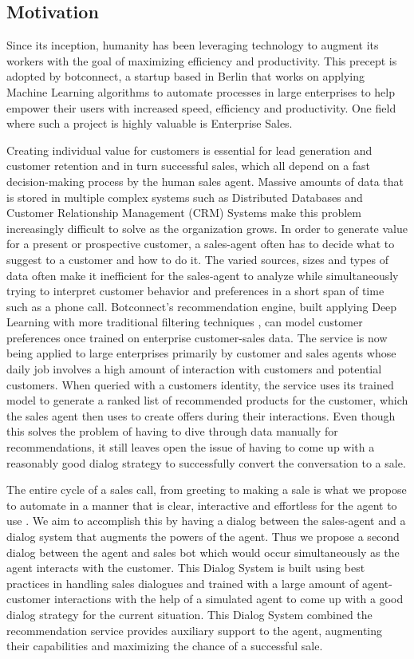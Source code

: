 \documentclass[14pt]{extarticle}
\numberwithin{equation}{section}
\begin{document}
	\subsection{Motivation}
	Since its inception, humanity has been leveraging technology to augment its workers with the goal of maximizing efficiency and productivity. This precept is adopted by botconnect, a startup based in Berlin that works on applying Machine Learning algorithms to automate processes in large enterprises to help empower their users with increased speed, efficiency and productivity. One field where such a project is highly valuable is Enterprise Sales. \par
	Creating individual value for customers is essential for lead generation and customer retention and in turn successful sales, which all depend on a fast decision-making process by the human sales agent. Massive amounts of data that is stored in multiple complex systems such as Distributed Databases and Customer Relationship Management (CRM) Systems make this problem increasingly difficult to solve as the organization grows. In order to generate value for a present or prospective customer, a sales-agent often has to decide what to suggest to a customer and how to do it. The varied sources, sizes and types of data often make it inefficient for the sales-agent to analyze while simultaneously trying to interpret customer behavior and preferences in a short span of time such as a phone call. Botconnect's recommendation engine, built applying Deep Learning with more traditional filtering techniques \cite{ncf2017}, can model customer preferences once trained on enterprise customer-sales data. The service is now being applied to large enterprises primarily by customer and sales agents whose daily job involves a high amount of interaction with customers and potential customers. \label{plag1} When queried with a customers identity, the service uses its trained model to generate a ranked list of recommended products for the customer, which the sales agent then uses to create offers during their interactions. Even though this solves the problem of having to dive through data manually for recommendations, it still leaves open the issue of having to come up with a reasonably good dialog strategy to successfully convert the conversation to a sale.\par  \label{plag10} 
	The entire cycle of a sales call, from greeting to making a sale is what we propose to automate in a manner that is clear, interactive and effortless for the agent to use \cite{frey2017future}. We aim to accomplish this by having a dialog \cite{Tao_of_CHI} between the sales-agent and a dialog system that augments the powers of the agent. Thus we propose a second dialog between the agent and sales bot which would  occur simultaneously as the agent interacts with the customer. This Dialog System is built using best practices in handling sales dialogues and trained with a large amount of agent-customer interactions with the help of a simulated agent to come up with a good dialog strategy for the current situation. This Dialog System combined the recommendation service provides auxiliary support to the agent, augmenting their capabilities and maximizing the chance of a successful sale. \par
\end{document}
